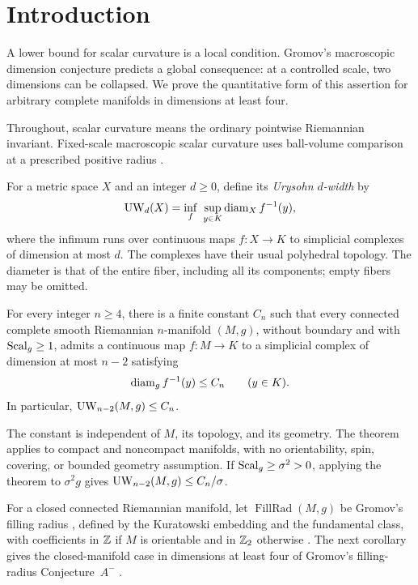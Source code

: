 \section{Introduction}\label{sec:introduction}

A lower bound for scalar curvature is a local condition. Gromov's
macroscopic dimension conjecture predicts a global consequence: at a
controlled scale, two dimensions can be collapsed. We prove the
quantitative form of this assertion for arbitrary complete manifolds
in dimensions at least four.

Throughout, scalar curvature means the ordinary pointwise Riemannian
invariant. Fixed-scale macroscopic scalar curvature uses ball-volume
comparison at a prescribed positive radius
\citep[Definitions~1.2--1.3]{kumarSen2026Width}.

For a metric space \(X\) and an integer \(d\ge0\), define its
\emph{Urysohn \(d\)-width} by
\[
 \operatorname{UW}_d(X)=\inf_f\ \sup_{y\in K}\operatorname{diam}_X f^{-1}(y),
\]
where the infimum runs over continuous maps \(f:X\to K\) to simplicial
complexes of dimension at most \(d\). The complexes have their usual
polyhedral topology. The diameter is that of the entire fiber, including
all its components; empty fibers may be omitted.

\begin{theorem}\label{thm:main}
For every integer \(n\ge4\), there is a finite constant \(C_n\) such
that every connected complete smooth Riemannian \(n\)-manifold
\((M,g)\), without boundary and with \(\operatorname{Scal}_g\ge1\), admits a
continuous map \(f:M\to K\) to a simplicial complex of dimension at
most \(n-2\) satisfying
\[
 \operatorname{diam}_g f^{-1}(y)\le C_n\qquad(y\in K).
\]
In particular, \(\operatorname{UW}_{n-2}(M,g)\le C_n\).
\end{theorem}

The constant is independent of \(M\), its topology, and its geometry.
The theorem applies to compact and noncompact manifolds, with no
orientability, spin, covering, or bounded geometry assumption. If
\(\operatorname{Scal}_g\ge\sigma^2>0\), applying the theorem to \(\sigma^2g\) gives
\(\operatorname{UW}_{n-2}(M,g)\le C_n/\sigma\).

For a closed connected Riemannian manifold, let
\(\operatorname{FillRad}(M,g)\) be Gromov's filling radius
\citep{gromov1983Filling}, defined by the Kuratowski embedding and the
fundamental class, with coefficients in
\(\mathbb Z\) if \(M\) is orientable and in \(\mathbb Z_2\) otherwise
\citep[Definition~3.1]{nabutovskyRotmanSabourau2021}.
The next corollary gives the closed-manifold case in dimensions at least
four of Gromov's filling-radius Conjecture~\(A^{-}\)
\citep[\S3]{gromov2017Dozen}.


